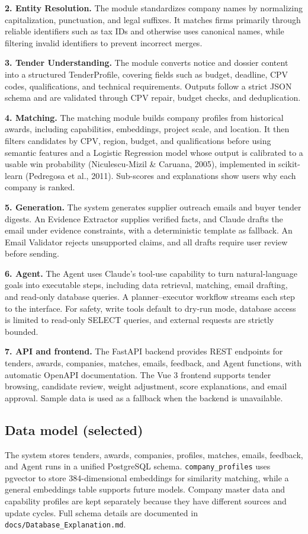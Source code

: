 \textbf{2. Entity Resolution.} The module standardizes company names by normalizing
capitalization, punctuation, and legal suffixes. It matches firms primarily through
reliable identifiers such as tax IDs and otherwise uses canonical names, while
filtering invalid identifiers to prevent incorrect merges.

\textbf{3. Tender Understanding.} The module converts notice and dossier content
into a structured TenderProfile, covering fields such as budget, deadline, CPV codes,
qualifications, and technical requirements. Outputs follow a strict JSON schema and
are validated through CPV repair, budget checks, and deduplication.

\textbf{4. Matching.} The matching module builds company profiles from historical
awards, including capabilities, embeddings, project scale, and location. It then
filters candidates by CPV, region, budget, and qualifications before using semantic
features and a Logistic Regression model whose output is calibrated to a usable win
probability (Niculescu-Mizil \& Caruana, 2005), implemented in scikit-learn
(Pedregosa et al., 2011).
Sub-scores and explanations show users why each company is ranked.

\textbf{5. Generation.} The system generates supplier outreach emails and buyer
tender digests. An Evidence Extractor supplies verified facts, and Claude drafts the
email under evidence constraints, with a deterministic template as fallback. An Email
Validator rejects unsupported claims, and all drafts require user review before
sending.

\textbf{6. Agent.} The Agent uses Claude's tool-use capability to turn
natural-language goals into executable steps, including data retrieval, matching,
email drafting, and read-only database queries. A planner--executor workflow streams
each step to the interface. For safety, write tools default to dry-run mode, database
access is limited to read-only SELECT queries, and external requests are strictly
bounded.

\textbf{7. API and frontend.} The FastAPI backend provides REST endpoints for
tenders, awards, companies, matches, emails, feedback, and Agent functions, with
automatic OpenAPI documentation. The Vue 3 frontend supports tender browsing,
candidate review, weight adjustment, score explanations, and email approval. Sample
data is used as a fallback when the backend is unavailable.

\subsection{Data model (selected)}
The system stores tenders, awards, companies, profiles, matches, emails, feedback,
and Agent runs in a unified PostgreSQL schema. \texttt{company\_profiles} uses
pgvector to store 384-dimensional embeddings for similarity matching, while a general
embeddings table supports future models. Company master data and capability profiles
are kept separately because they have different sources and update cycles. Full schema
details are documented in \texttt{docs/Database\_Explanation.md}.

